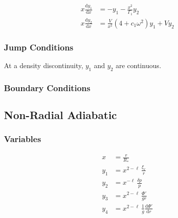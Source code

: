 \documentclass[fleqn]{article}
\newcommand{\diff}{\ensuremath{\mathrm{d}}}
\newcommand{\Rstar}{\ensuremath{R_{\ast}}}
\begin{document}
\begin{align*}
x \frac{\diff y_{1}}{\diff x} &=
- y_{1} - \frac{x^{2}}{\Gamma_{1}} y_{2} \\
x \frac{\diff y_{2}}{\diff x} &=
\frac{V}{x^{2}} \left(4 + c_{1} \omega^{2} \right) y_{1} +
V y_{2}
\end{align*}

\subsubsection*{Jump Conditions}

At a density discontinuity, $y_{1}$ and $y_{2}$ are continuous.

\subsubsection*{Boundary Conditions}




\newpage

\subsection*{Non-Radial Adiabatic}

\subsubsection*{Variables}

\begin{align*}
x     &= \frac{r}{\Rstar} \\
y_{1} &= x^{2-\ell}\, \frac{\xi_{r}}{r} \\
y_{2} &= x^{ -\ell}\, \frac{\delta p}{p} \\
y_{3} &= x^{2-\ell}\, \frac{\Phi'}{gr} \\
y_{4} &= x^{2-\ell}\, \frac{1}{g} \frac{\diff \Phi'}{\diff r} \\
\end{align*}
\end{document}
